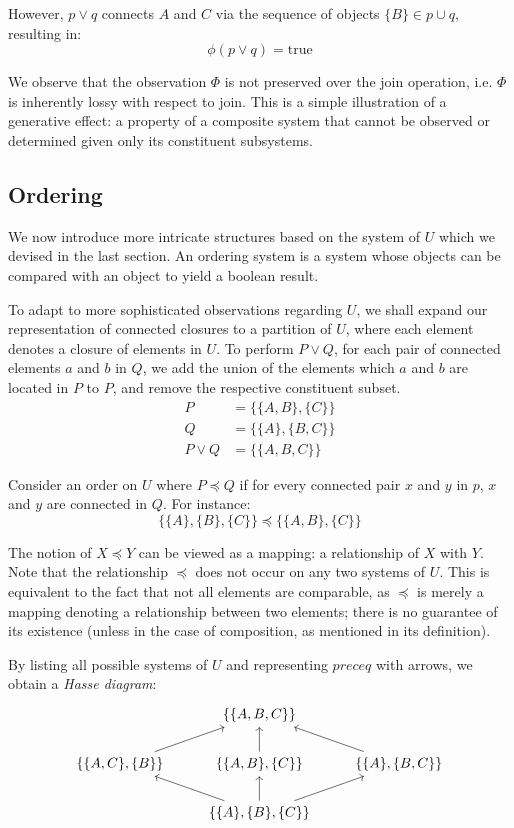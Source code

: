 \documentclass[12pt]{article}
\theoremstyle{definition}
\begin{document}
	However, $p \lor q$ connects $A$ and $C$ via the sequence of objects $\{B\} \in p \cup q$, resulting in: $$\phi(p \lor q) = \text{true}$$
	
	We observe that the observation $\Phi$ is not preserved over the join operation, i.e. $\Phi$ is inherently lossy with respect to join. This is a simple illustration of a generative effect: a property of a composite system that cannot be observed or determined given only its constituent subsystems.
	
	\subsection{Ordering}
	
	We now introduce more intricate structures based on the system of $U$ which we devised in the last section. An ordering system is a system whose objects can be compared with an object to yield a boolean result.
	
	To adapt to more sophisticated observations regarding $U$, we shall expand our representation of connected closures to a partition of $U$, where each element denotes a closure of elements in $U$. To perform $P \lor Q$, for each pair of connected elements $a$ and $b$ in $Q$, we add the union of the elements which $a$ and $b$ are located in $P$ to $P$, and remove the respective constituent subset.
	\begin{align*}
		P &= \{\{A, B\}, \{C\}\} \\
		Q &= \{\{A\}, \{B, C\}\} \\
		P \lor Q &= \{\{A, B, C\}\}
	\end{align*}
	
	Consider an order on $U$ where $P \preceq Q$ if for every connected pair $x$ and $y$ in $p$, $x$ and $y$ are connected in $Q$. For instance: $$\{\{A\}, \{B\}, \{C\}\} \preceq \{\{A, B\}, \{C\}\}$$
	
	The notion of $X \preceq Y$ can be viewed as a mapping: a relationship of $X$ with $Y$. Note that the relationship $\preceq$ does not occur on any two systems of $U$. This is equivalent to the fact that not all elements are comparable, as $\preceq$ is merely a mapping denoting a relationship between two elements; there is no guarantee of its existence (unless in the case of composition, as mentioned in its definition).
	
	By listing all possible systems of $U$ and representing $preceq$ with arrows, we obtain a \emph{Hasse diagram}:
	\begin{equation*}\begin{tikzcd}
		{} & \{\{A, B, C\}\} \\
		\{\{A, C\}, \{B\}\} \ar[ur] & \{\{A, B\}, \{C\}\} \ar[u] & \{\{A\}, \{B, C\}\} \ar[ul] \\
		{} & \{\{A\}, \{B\}, \{C\}\} \ar[ul] \ar[u] \ar[ur]
	\end{tikzcd}\end{equation*}
	
\end{document}
